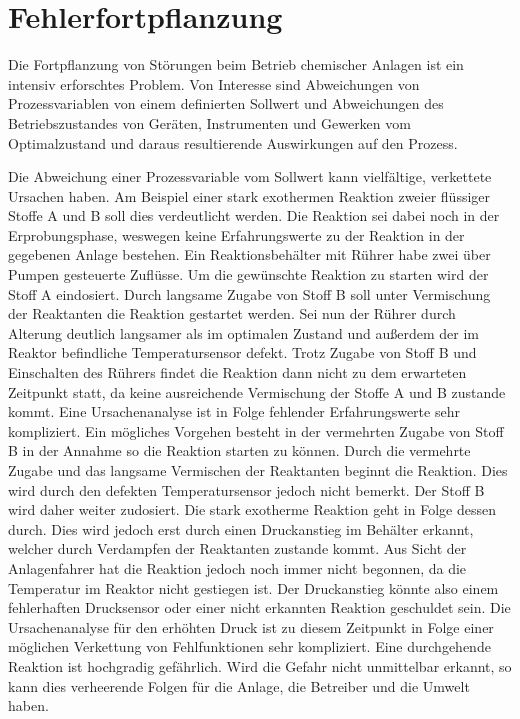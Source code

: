 \chapter{Fehlerfortpflanzung} \label{ch:fehlerfortpfl}
Die Fortpflanzung von St\"orungen beim Betrieb chemischer Anlagen ist ein intensiv erforschtes Problem. Von Interesse sind Abweichungen von Prozessvariablen von einem definierten Sollwert und Abweichungen des Betriebszustandes von Ger\"aten, Instrumenten und Gewerken vom Optimalzustand und daraus resultierende Auswirkungen auf den Prozess.

Die Abweichung einer Prozessvariable vom Sollwert kann vielf\"altige, verkettete Ursachen haben. Am Beispiel einer stark exothermen Reaktion zweier fl\"ussiger Stoffe A und B soll dies verdeutlicht werden. Die Reaktion sei dabei noch in der Erprobungsphase, weswegen keine Erfahrungswerte zu der Reaktion in der gegebenen Anlage bestehen. \linebreak
Ein Reaktionsbeh\"alter mit R\"uhrer habe zwei \"uber Pumpen gesteuerte Zufl\"usse. Um die gew\"unschte Reaktion zu starten wird der Stoff A eindosiert. Durch langsame Zugabe von Stoff B soll unter Vermischung der Reaktanten die Reaktion gestartet werden. Sei nun der R\"uhrer durch Alterung deutlich langsamer als im optimalen Zustand und au\ss{}erdem der im Reaktor befindliche Temperatursensor defekt. Trotz Zugabe von Stoff B und Einschalten des R\"uhrers findet die Reaktion dann nicht zu dem erwarteten Zeitpunkt statt, da keine ausreichende Vermischung der Stoffe A und B zustande kommt. Eine Ursachenanalyse ist in Folge fehlender Erfahrungswerte sehr kompliziert. Ein m\"ogliches Vorgehen besteht in der vermehrten Zugabe von Stoff B in der Annahme so die Reaktion starten zu k\"onnen. Durch die vermehrte Zugabe und das langsame Vermischen der Reaktanten beginnt die Reaktion. Dies wird durch den defekten Temperatursensor jedoch nicht bemerkt. Der Stoff B wird daher weiter zudosiert. Die stark exotherme Reaktion geht in Folge dessen durch. Dies wird jedoch erst durch einen Druckanstieg im Beh\"alter erkannt, welcher durch Verdampfen der Reaktanten zustande kommt. Aus Sicht der Anlagenfahrer hat die Reaktion jedoch noch immer nicht begonnen, da die Temperatur im Reaktor nicht gestiegen ist. Der Druckanstieg k\"onnte also einem fehlerhaften Drucksensor oder einer nicht erkannten Reaktion geschuldet sein. Die Ursachenanalyse f\"ur den erh\"ohten Druck ist zu diesem Zeitpunkt in Folge einer m\"oglichen Verkettung von Fehlfunktionen sehr kompliziert. Eine durchgehende Reaktion ist hochgradig gef\"ahrlich. Wird die Gefahr nicht unmittelbar erkannt, so kann dies verheerende Folgen f\"ur die Anlage, die Betreiber und die Umwelt haben.

